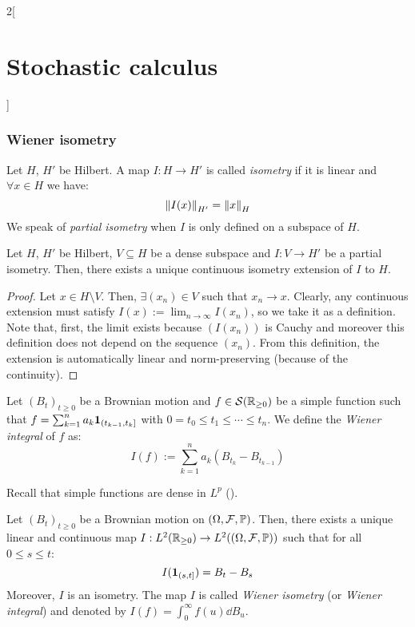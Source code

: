 \documentclass[../../../main_math.tex]{subfiles}
\begin{document}
\begin{multicols}{2}[\section{Stochastic calculus}]
  \subsubsection{Wiener isometry}
  \begin{definition}
    Let $H$, $H'$ be Hilbert. A map $I:H\to H'$ is called \emph{isometry} if it is linear and $\forall x\in H$ we have:
    $$
      \left\|I(x)\right\|_{H'}=\left\|x\right\|_H
    $$
    We speak of \emph{partial isometry} when $I$ is only defined on a subspace of $H$.
  \end{definition}
  \begin{theorem}
    Let $H$, $H'$ be Hilbert, $V\subseteq H$ be a dense subspace and $I:V\to H'$ be a partial isometry. Then, there exists a unique continuous isometry extension of $I$ to $H$.
  \end{theorem}
  \begin{proof}
    Let $x\in H\setminus V$. Then, $\exists(x_n)\in V$ such that $x_n\to x$. Clearly, any continuous extension must satisfy $I(x):=\lim_{n\to\infty}I(x_n)$, so we take it as a definition. Note that, first, the limit exists because $(I(x_n))$ is Cauchy and moreover this definition does not depend on the sequence $(x_n)$. From this definition, the extension is automatically linear and norm-preserving (because of the continuity).
  \end{proof}
  \begin{definition}
    Let ${(B_t)}_{t\geq 0}$ be a Brownian motion and $f\in\mathcal{S}(\mathbb{R}_{\geq 0})$ be a simple function such that $f=\sum_{k=1}^na_k\boldsymbol{\mathrm{1}}_{(t_{k-1},t_k]}$ with $0=t_0\leq t_1\leq \cdots\leq t_n$. We define the \emph{Wiener integral} of $f$ as:
    $$
      I(f):=\sum_{k=1}^na_k(B_{t_k}-B_{t_{k-1}})
    $$
  \end{definition}
  \begin{remark}
    Recall that simple functions are dense in $L^p$ ().
  \end{remark}
  \begin{theorem}
    Let ${(B_t)}_{t\geq 0}$ be a Brownian motion on $(\Omega, \mathcal{F}, \mathbb{P})$. Then, there exists a unique linear and continuous map $I:L^2(\mathbb{R}_{\geq 0})\to L^2((\Omega, \mathcal{F}, \mathbb{P}))$ such that for all $0\leq s\leq t$:
    $$
      I(\boldsymbol{\mathrm{1}}_{(s,t]})=B_t-B_s
    $$
    Moreover, $I$ is an isometry. The map $I$ is called \emph{Wiener isometry} (or \emph{Wiener integral}) and denoted by $I(f)=\int_0^\infty f(u)\dd{B_u}$.
  \end{theorem}
  \begin{remark}

\end{remark}
\end{multicols}
\end{document}
